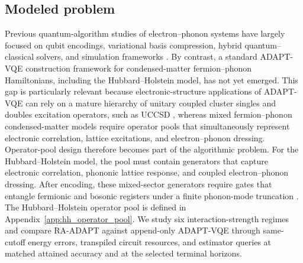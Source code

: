 \documentclass[
  reprint,
  amsmath,
  amssymb,
  aps,
  pra,
  nofootinbib,
  superscriptaddress,
  floatfix
]{revtex4-2}
\begin{document}
\subsection{Modeled problem}
Previous quantum-algorithm studies of electron--phonon systems have largely focused on qubit encodings, variational basis compression, hybrid quantum--classical solvers, and simulation frameworks \cite{Macridin2018,Li2023,Denner2023,Peng2025BosonHamiltonians}. By contrast, a standard ADAPT-VQE construction framework for condensed-matter fermion--phonon Hamiltonians, including the Hubbard--Holstein model, has not yet emerged. This gap is particularly relevant because electronic-structure applications of ADAPT-VQE can rely on a mature hierarchy of unitary coupled cluster singles and doubles excitation operators, such as UCCSD \cite{Romero2018UCC,Grimsley2019}, whereas mixed fermion--phonon condensed-matter models require operator pools that simultaneously represent electronic correlation, lattice excitations, and electron--phonon dressing. Operator-pool design therefore becomes part of the algorithmic problem. For the Hubbard--Holstein model, the pool must contain generators that capture electronic correlation, phononic lattice response, and coupled electron--phonon dressing. After encoding, these mixed-sector generators require gates that entangle fermionic and bosonic registers under a finite phonon-mode truncation \cite{Hubbard1963,Holstein1959a,Holstein1959b}. The Hubbard--Holstein operator pool is defined in Appendix~\ref{app:hh_operator_pool}. We study six interaction-strength regimes and compare RA-ADAPT against append-only ADAPT-VQE through same-cutoff energy errors, transpiled circuit resources, and estimator queries at matched attained accuracy and at the selected terminal horizons.
\end{document}
